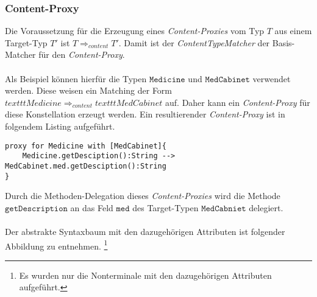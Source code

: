 \documentclass[a4paper,12pt]{article}
\begin{document}
\subsubsection{Content-Proxy}
Die Voraussetzung für die Erzeugung eines \emph{Content-Proxies} vom Typ $T$ aus einem Target-Typ $T'$ ist $T \Rightarrow_{content} T'$. Damit ist der \emph{ContentTypeMatcher} der Basis-Matcher für den \emph{Content-Proxy}.\\\\
Als Beispiel können hierfür die Typen $\texttt{Medicine}$ und $\texttt{MedCabinet}$ verwendet werden. Diese weisen ein Matching der Form $texttt{Medicine} \Rightarrow_{content} texttt{MedCabinet}$ auf. Daher kann ein \emph{Content-Proxy} für diese Konstellation erzeugt werden. Ein resultierender \emph{Content-Proxy} ist in folgendem Listing aufgeführt.
\begin{lstlisting}[style = dsl]
proxy for Medicine with [MedCabinet]{
	Medicine.getDesciption():String --> MedCabinet.med.getDesciption():String
}
\end{lstlisting}
Durch die Methoden-Delegation dieses \emph{Content-Proxies} wird die Methode $\texttt{getDescription}$ an das Feld $\texttt{med}$ des Target-Typen $\texttt{MedCabniet}$ delegiert.\\\\
Der abstrakte Syntaxbaum mit den dazugehörigen Attributen ist folgender Abbildung zu entnehmen. \footnote{Es wurden nur die Nonterminale mit den dazugehörigen Attributen aufgeführt.}
\begin{figure}

\end{figure}
\end{document}
